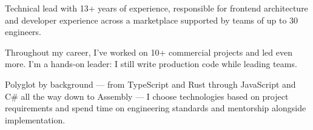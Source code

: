 

\begin{cvparagraph}

Technical lead with 13+ years of experience, responsible for frontend architecture and developer experience across a marketplace supported by teams of up to 30 engineers.

Throughout my career, I've worked on 10+ commercial projects and led even more. I'm a hands-on leader: I still write production code while leading teams.

Polyglot by background — from TypeScript and Rust through JavaScript and C\# all the way down to Assembly — I choose technologies based on project requirements and spend time on engineering standards and mentorship alongside implementation.
\end{cvparagraph}
